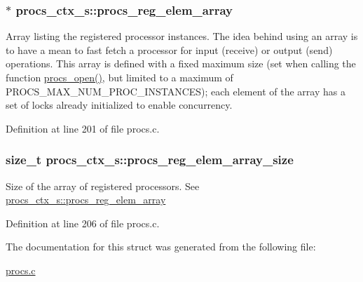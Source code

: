 \subsubsection[{\texorpdfstring{procs\+\_\+reg\+\_\+elem\+\_\+array}{procs_reg_elem_array}}]{$\ast$ procs\+\_\+ctx\+\_\+s\+::procs\+\_\+reg\+\_\+elem\+\_\+array}\hypertarget{structprocs__ctx__s_a9ad98a927f0a5585076b32faf26a054d}{}\label{structprocs__ctx__s_a9ad98a927f0a5585076b32faf26a054d}
Array listing the registered processor instances. The idea behind using an array is to have a mean to fast fetch a processor for input (receive) or output (send) operations. This array is defined with a fixed maximum size (set when calling the function \textquotesingle{}\hyperlink{procs_8c_ac44b6ac931afbeadeb7f07b660e30bac}{procs\+\_\+open()}\textquotesingle{}, but limited to a maximum of P\+R\+O\+C\+S\+\_\+\+M\+A\+X\+\_\+\+N\+U\+M\+\_\+\+P\+R\+O\+C\+\_\+\+I\+N\+S\+T\+A\+N\+C\+ES); each element of the array has a set of locks already initialized to enable concurrency. 

Definition at line 201 of file procs.\+c.

\subsubsection[{\texorpdfstring{procs\+\_\+reg\+\_\+elem\+\_\+array\+\_\+size}{procs_reg_elem_array_size}}]{\setlength{\rightskip}{0pt plus 5cm}size\+\_\+t procs\+\_\+ctx\+\_\+s\+::procs\+\_\+reg\+\_\+elem\+\_\+array\+\_\+size}\hypertarget{structprocs__ctx__s_a083c965ff29e9b8af9215db80cca7c99}{}\label{structprocs__ctx__s_a083c965ff29e9b8af9215db80cca7c99}
Size of the array of registered processors. See \textquotesingle{}\hyperlink{structprocs__ctx__s_a9ad98a927f0a5585076b32faf26a054d}{procs\+\_\+ctx\+\_\+s\+::procs\+\_\+reg\+\_\+elem\+\_\+array}\textquotesingle{} 

Definition at line 206 of file procs.\+c.



The documentation for this struct was generated from the following file\+:\begin{DoxyCompactItemize}
\item 
\hyperlink{procs_8c}{procs.\+c}\end{DoxyCompactItemize}
